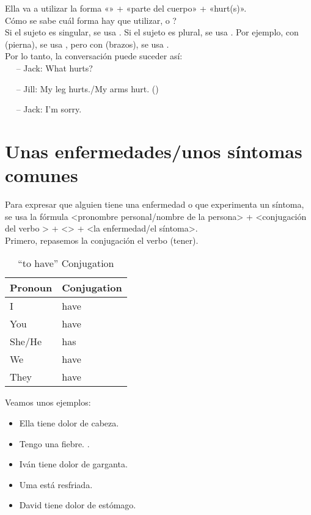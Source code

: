 Ella va a utilizar la forma «» + «parte del cuerpo» + «hurt(s)». \\

\textquestiondown C\'omo se sabe cu\'al forma hay que utilizar,  o ?\\

Si el sujeto es singular, se usa . Si el sujeto es plural, se usa .
Por ejemplo, con  (pierna), se usa , pero con  (brazos), se usa . \\

Por lo tanto, la conversaci\'on puede suceder as\'i:\\

$\quad$ -- Jack: What hurts?

$\quad$ -- Jill:  My leg hurts./My arms hurt. ()

$\quad$ -- Jack: I'm sorry. \\


\section{Unas enfermedades/unos s\'intomas comunes}

Para expresar que alguien tiene una enfermedad o que experimenta un s\'intoma,
se usa la f\'ormula <pronombre personal/nombre de la persona> +
<conjugaci\'on del verbo > +
<> + <la enfermedad/el s\'intoma>. \\

Primero, repasemos la conjugaci\'on el verbo  (tener).

\begin{table}[H]
	\centering
	\begin{tabular}{ll}
	\toprule
		\textbf{Pronoun} & \textbf{Conjugation} \\
	\midrule
		I & have\\
		You & have \\
		She/He & has \\
		We & have \\
		They & have \\
	\bottomrule
	\end{tabular}
	\caption{``to have'' Conjugation}
\end{table}

Veamos unos ejemplos:

\begin{itemize}
	\item Ella tiene dolor de cabeza.
		\arr {}
	\item Tengo una fiebre.
		\arr {}.
	\item Iv\'an tiene dolor de garganta.
		\arr {}
	\item Uma est\'a resfriada.
		\arr {}
	\item David tiene dolor de est\'omago.
		\arr {}
\end{itemize}

